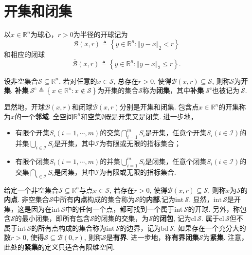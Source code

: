 \section{开集和闭集}
以$x \in \mathbb{R}^{n}$为球心，$r > 0$为半径的开球记为 
\begin{equation*}
    \mathcal{B}\left(x,r\right) \triangleq \left\{ y \in \mathbb{R}^{n} : \Vert y - x \Vert_{2} < r \right\}
\end{equation*}
和相应的闭球
\begin{equation*}
    \overline{\mathcal{B}}\left(x,r\right) \triangleq \left\{ y \in \mathbb{R}^{n} : \Vert y - x \Vert_{2} \leq r \right\}.
\end{equation*}

\begin{definition}\label{Chapter0Open}
    设非空集合$\mathcal{S} \subseteq \mathbb{R}^{n}$. 若对任意的$x \in \mathcal{S}$, 总存在$r > 0$, 使得$\mathcal{B}\left(x,r\right) \subseteq \mathcal{S}$, 则称$\mathcal{S}$为\textbf{开集}. \textbf{补集}$~\mathcal{S}^{\mathrm{c}} \triangleq \left\{ x \in \mathbb{R}^{n} : x \notin \mathcal{S} \right\}$为开集的集合$\mathcal{S}$称为\textbf{闭集}，其中\textbf{补集}$~\mathcal{S}^{\mathrm{c}}$也被记为$~\overline{\mathcal{S}}$.
\end{definition}

显然地，开球$\mathcal{B}\left(x,r\right)$和闭球$\overline{\mathcal{B}}\left(x,r\right)$分别是开集和闭集. 包含点$x \in \mathbb{R}^{n}$的开集称为$x$的一个\textbf{邻域}. 全空间$\mathbb{R}^{n}$和空集$\emptyset$既是开集又是闭集. 进一步地，
\begin{itemize}
 \setlength{\itemsep}{0pt}
 \setlength{\parsep}{0pt}
 \setlength{\parskip}{0pt}
     \item[$(1)$] 有限个开集$S_i(i=1,\cdots,m)$的交集$\bigcap_{i=1}^{m}S_i$是开集，任意个开集$S_i(i \in \mathcal{I} )$的并集$\bigcup_{i \in \mathcal{I}}S_i$是开集，其中$\mathcal{I}$为有限或无限的指标集合；
     \item[$(2)$] 有限个闭集$S_i(i=1,\cdots,m)$的并集$\bigcup_{i=1}^{m}S_i$是闭集，任意个闭集$S_i(i \in \mathcal{I} )$的交集$\bigcap_{i \in \mathcal{I}}S_i$是闭集，其中$\mathcal{I}$为有限或无限的指标集合.
\end{itemize}

给定一个非空集合$\mathcal{S} \subseteq \mathbb{R}^{n}$与点$x \in \mathcal{S}$, 若存在$r > 0$, 使得$\mathcal{B}\left(x,r\right) \subseteq \mathcal{S}$, 则称$x$为$\mathcal{S}$的\textbf{内点}. 非空集合$\mathcal{S}$中所有\textbf{内点}构成的集合称为$\mathcal{S}$的\textbf{内部},记为$\mathrm{int}\,\mathcal{S}$. 显然，$\mathrm{int}\,\mathcal{S}$是开集，这是因为在$\mathrm{int}\,\mathcal{S}$中的任何一个点，都可找到一个属于$\mathrm{int}\,\mathcal{S}$的开球. 另外，称包含$\mathcal{S}$的最小闭集，即所有包含$\mathcal{S}$的闭集的交集，为$\mathcal{S}$的\textbf{闭包}, 记为$\mathrm{cl}\,\mathcal{S}$. 属于$\mathrm{cl}\,\mathcal{S}$但不属于$\mathrm{int}\,\mathcal{S}$的所有点构成的集合称为$\mathrm{int}\,\mathcal{S}$的边界，记为$\mathrm{bd}\,\mathcal{S}$. 如果存在一个充分大的数$r > 0$, 使得$\mathcal{S} \subseteq \mathcal{B}\left(0,r\right)$, 则称$\mathcal{S}$是\textbf{有界}. 进一步地，称\textbf{有界闭集}$\mathcal{S}$为\textbf{紧集}. 注意，此处的\textbf{紧集}的定义只适合有限维空间.

